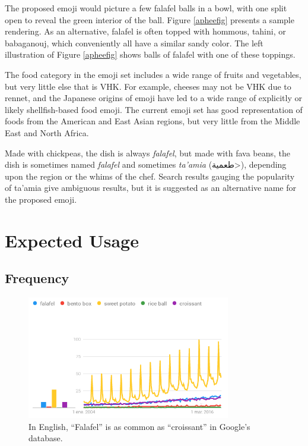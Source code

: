 \documentclass[a4paper,10pt]{article}
\begin{document}
The proposed emoji would picture a few falafel balls in a bowl, with one
split open to reveal the green interior of the ball. Figure \ref{apheefig} presents
a sample rendering. As an alternative, falafel is often topped with hommous, tahini,
or babaganouj, which conveniently all have a similar sandy color. The left illustration
of Figure \ref{apheefig} shows balls of falafel with one of these toppings.

The food category in the emoji set includes a wide range of fruits and vegetables, but
very little else that is VHK. For example, cheeses may not be VHK due to rennet, and the
Japanese origins of emoji have led to a wide range of explicitly or likely
shellfish-based food emoji. The current emoji set has good representation of foods
from the American and East Asian regions, but very little from the Middle East and
North Africa.

Made with chickpeas, the dish is always {\em falafel}, but made with fava beans, the dish
is sometimes named {\em falafel} and sometimes {\em ta'amia} (\<طعمية>), depending upon the
region or the whims of the chef. Search results gauging the popularity of ta'amia give
ambiguous results, but it is suggested as an alternative name for the proposed emoji.

\section{Expected Usage}
\enlargethispage{\baselineskip} %
\enlargethispage{\baselineskip}

\subsection{Frequency}\label{freqsec}

\begin{figure}
\begin{center}
\includegraphics[width=3.5in]{trends.png}
\end{center}
\caption{In English, ``Falafel'' is as common as ``croissant'' in Google's database.}
\label{engplot}
\end{figure}
\end{document}
